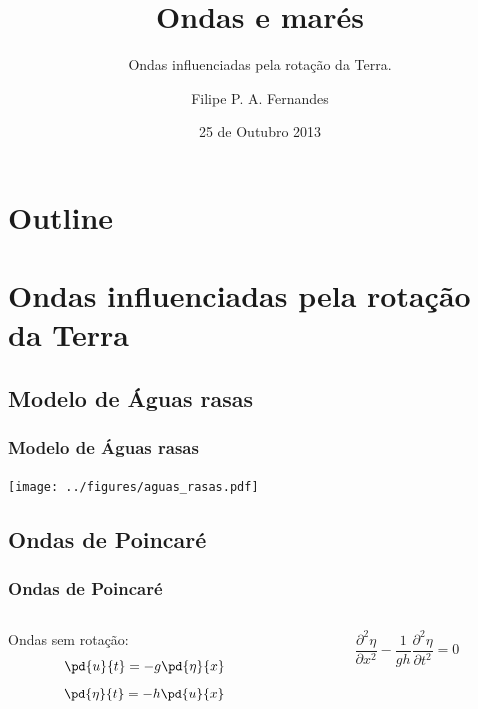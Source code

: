 \title[Aula 07]{Ondas e marés}
\subtitle{Ondas influenciadas pela rotação da Terra.}
\author[Filipe Fernandes]{Filipe P. A. Fernandes}
\date[Outubro 2013]{25 de Outubro 2013}




\begin{frame}[plain]
  \titlepage
\end{frame}

\section*{Outline}
\begin{frame}
\tableofcontents
\end{frame}

\section{Ondas influenciadas pela rotação da Terra}
\subsection{Modelo de Águas rasas}
\begin{frame}
  \frametitle{Modelo de Águas rasas}
  \begin{center}
    \texttt{[image: ../figures/aguas\_rasas.pdf]}
  \end{center}
\end{frame}

\subsection{Ondas de Poincaré}
\begin{frame}
\frametitle{Ondas de Poincaré}
  \begin{columns}
    \begin{column}{0.5\textwidth}
    \begin{block}{}
      Ondas sem rotação:
      \[\pd{u}{t} = -g\pd{\eta}{x}\]
      \[\pd{\eta}{t} = -h\pd{u}{x}\]
    \end{block}
    \end{column}
    \begin{column}{0.5\textwidth}
    \begin{block}{}
      \[\frac{\partial^2\eta}{\partial x^2} - \frac{1}{gh}\frac{\partial^2\eta}{\partial{t^2}} = 0\]
    \end{block}
    \end{column}
  \end{columns}
\end{frame}

